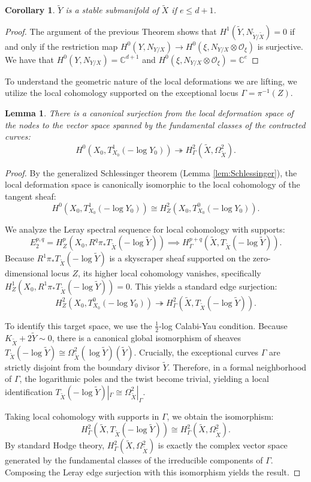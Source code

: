 \documentclass[11pt]{article}
\newtheorem{lem}[thm]{Lemma}
\newtheorem{cor}[thm]{Corollary}
\theoremstyle{definition}
\newcommand{\OO}{\mathcal{O}}
\begin{document}
\begin{cor}
  $\tilde Y$ is a stable submanifold of $\tilde X$ if $e\leq d+1$.
\end{cor}
\begin{proof}
  The argument of the previous Theorem shows that $H^1(\tilde Y, N_{\tilde Y/\tilde X})=0$ if and only if the restriction map $H^0(Y, N_{Y/X})\to H^0(\xi, N_{Y/X}\otimes \OO_\xi)$ is surjective. 
  We have that $H^0(Y, N_{Y/X})=\mathbb{C}^{d+1}$ and  $H^0(\xi, N_{Y/X}\otimes \OO_\xi)=\mathbb{C}^e$
\end{proof}


To understand the geometric nature of the local deformations we are lifting, we utilize the local cohomology supported on the exceptional locus $\Gamma = \pi^{-1}(Z)$. 

\begin{lem} \label{lem:local_CY_identification}
There is a canonical surjection from the local deformation space of the nodes to the vector space spanned by the fundamental classes of the contracted curves:
\[
H^0(X_0, T^1_{X_0}(-\log Y_0)) \twoheadrightarrow H^2_\Gamma(\tilde{X}, \Omega^2_{\tilde{X}}).
\]
\end{lem}
\begin{proof}
By the generalized Schlessinger theorem (Lemma \ref{lem:Schlessinger}), the local deformation space is canonically isomorphic to the local cohomology of the tangent sheaf: 
$$H^0(X_0, T^1_{X_0}(-\log Y_0)) \cong H^2_Z(X_0, T^0_{X_0}(-\log Y_0)).$$ 

We analyze the Leray spectral sequence for local cohomology with supports: $$E_2^{p,q} = H_Z^p(X_0, R^q \pi_* T_{\tilde{X}}(-\log \tilde{Y})) \implies H^{p+q}_\Gamma(\tilde{X}, T_{\tilde{X}}(-\log \tilde{Y})).$$ Because $R^1\pi_* T_{\tilde{X}}(-\log \tilde{Y})$ is a skyscraper sheaf supported on the zero-dimensional locus $Z$, its higher local cohomology vanishes, specifically $H^1_Z(X_0, R^1\pi_* T_{\tilde{X}}(-\log \tilde{Y})) = 0.$ This yields a standard edge surjection:
\[
H^2_Z(X_0, T^0_{X_0}(-\log Y_0)) \twoheadrightarrow H^2_\Gamma(\tilde{X}, T_{\tilde{X}}(-\log \tilde{Y})).
\]

To identify this target space, we use the $\frac{1}{2}$-log Calabi-Yau condition. Because $K_{\tilde{X}} + 2\tilde{Y} \sim 0$, there is a canonical global isomorphism of sheaves $T_{\tilde{X}}(-\log \tilde{Y}) \cong \Omega_{\tilde{X}}^2(\log \tilde{Y})(\tilde{Y})$. 
Crucially, the exceptional curves $\Gamma$ are strictly disjoint from the boundary divisor $\tilde{Y}$. Therefore, in a formal neighborhood of $\Gamma$, the logarithmic poles and the twist become trivial, yielding a local identification $T_{\tilde{X}}(-\log \tilde{Y})|_\Gamma \cong \Omega^2_{\tilde{X}}|_\Gamma$. 

Taking local cohomology with supports in $\Gamma$, we obtain the isomorphism:
\[
H^2_\Gamma(\tilde{X}, T_{\tilde{X}}(-\log \tilde{Y})) \cong H^2_\Gamma(\tilde{X}, \Omega^2_{\tilde{X}}).
\]
By standard Hodge theory, $H^2_\Gamma(\tilde{X}, \Omega^2_{\tilde{X}})$ is exactly the complex vector space generated by the fundamental classes of the irreducible components of $\Gamma$. Composing the Leray edge surjection with this isomorphism yields the result.
\end{proof}
\end{document}
